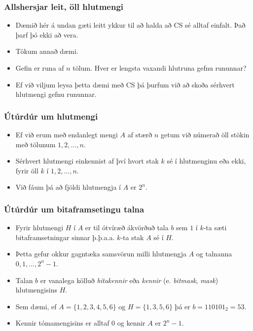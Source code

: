 \documentclass{beamer}
\begin{document}
\begin{frame}
	\frametitle{Allshersjar leit, öll hlutmengi}
\begin{itemize}
	\item<1-> Dæmið hér á undan gæti leitt ykkur til að halda að CS sé alltaf einfalt. Það þarf þó ekki að vera.
	\item<2-> Tökum annað dæmi.
	\item<3-> Gefin er runa af $n$ tölum. Hver er lengsta vaxandi hlutruna gefnu rununnar?
	\item<4-> Ef við viljum leysa þetta dæmi með CS þá þurfum við að skoða sérhvert hlutmengi gefnu rununnar.
\end{itemize}
\end{frame}

\begin{frame}
	\frametitle{Útúrdúr um hlutmengi}
\begin{itemize}
	\item<1-> Ef við erum með endanlegt mengi $A$ af stærð $n$ getum við númerað öll stökin með tölunum $1, 2, ..., n$.
	\item<2-> Sérhvert hlutmengi einkennist af því hvort stak $k$ sé í hlutmenginu eða ekki, fyrir öll $k$ í $1, 2, ..., n$.
	\item<3-> Við fáum þá að fjöldi hlutmengja í $A$ er $2^n$.
\end{itemize}
\end{frame}

\begin{frame}
	\frametitle{Útúrdúr um bitaframsetingu talna}
\begin{itemize}
	\item<1-> Fyrir hlutmengi $H$ í $A$ er til ótvíræð ákvörðuð tala $b$ sem $1$ í
		$k$-ta sæti bitaframsetningar sinnar þ.þ.a.a. $k$-ta stak $A$ sé í $H$.
	\item<2-> Þetta gefur okkur gagntæka samsvörun milli hlutmengja $A$ og talnanna $0, 1, ..., 2^n - 1$.
	\item<3-> Talan $b$ er vanalega kölluð \emph{bitakennir} eða \emph{kennir} (e. \emph{bitmask}, \emph{mask}) hlutmengisins $H$.
	\item<4-> Sem dæmi, ef $A = \{1, 2, 3, 4, 5, 6\}$ og $H = \{1, 3, 5, 6\}$ þá er $b = 110101_2 = 53$.
	\item<5-> Kennir tómamengisins er alltaf $0$ og kennir $A$ er $2^n - 1$.
\end{itemize}
\end{frame}
\end{document}
